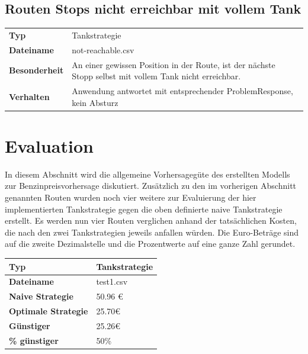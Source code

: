 \documentclass[
ngerman          %
,a4paper          %
,11pt
,pdftex
]{report}
\begin{document}
\subsection{Routen Stops nicht erreichbar mit vollem Tank}

\begin{table}[H]
	\centering
	\begin{tabular}{l l}
    	\hline
		\textbf{Typ} & Tankstrategie \\ 
		\textbf{Dateiname} & not-reachable.csv \\
        \textbf{Besonderheit} & An einer gewissen Position in der Route, ist der nächste Stopp selbst mit vollem Tank nicht erreichbar. \\
        \textbf{Verhalten} & Anwendung antwortet mit entsprechender ProblemResponse, kein Absturz \\
		\hline 
	\end{tabular}
\end{table} 


\section{Evaluation}
In diesem Abschnitt wird die allgemeine Vorhersagegüte des erstellten Modells zur Benzinpreisvorhersage diskutiert. Zusätzlich zu den im vorherigen Abschnitt genannten Routen wurden noch vier weitere zur Evaluierung der hier implementierten Tankstrategie gegen die oben definierte naive Tankstrategie erstellt. Es werden nun vier Routen verglichen anhand der tatsächlichen Kosten, die nach den zwei Tankstrategien jeweils anfallen würden. Die Euro-Beträge sind auf die zweite Dezimalstelle und die Prozentwerte auf eine ganze Zahl gerundet.

\begin{table}[H]
	\centering
	\begin{tabular}{l l}
		\textbf{Typ} & Tankstrategie \\ 
		\hline
		\hline
		\textbf{Dateiname} & test1.csv \\
        \textbf{Naive Strategie} & 50.96 \euro{} \\
        \textbf{Optimale Strategie} & 25.70\euro{} \\
  		\textbf{Günstiger} & 25.26\euro{} \\
        \textbf{\% günstiger} & 50\% \\
		\hline 
	\end{tabular}
\end{table} 
\end{document}
